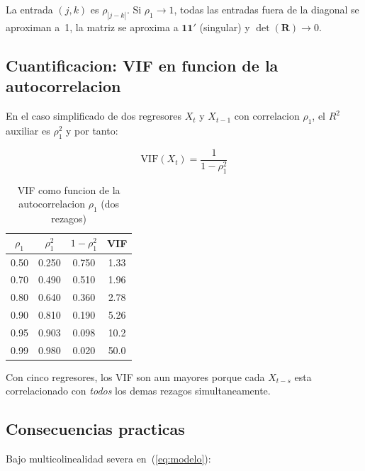 \documentclass[12pt, letterpaper]{article}
\theoremstyle{remark}
\begin{document}
\noindent La entrada $(j,k)$ es $\rho_{|j-k|}$. Si $\rho_1 \to 1$, todas las
entradas fuera de la diagonal se aproximan a~1, la matriz se aproxima a
$\mathbf{1}\mathbf{1}'$ (singular) y $\det(\mathbf{R}) \to 0$.

\subsection{Cuantificacion: VIF en funcion de la autocorrelacion}

En el caso simplificado de dos regresores $X_t$ y $X_{t-1}$ con correlacion
$\rho_1$, el $R^2$ auxiliar es $\rho_1^2$ y por tanto:

\begin{equation}
  \text{VIF}(X_t) = \frac{1}{1 - \rho_1^2}
  \label{eq:VIF_rho}
\end{equation}

\begin{table}[ht]
\centering
\caption{VIF como funcion de la autocorrelacion $\rho_1$ (dos rezagos)}
\label{tab:VIF}
\small
\begin{tabular}{cccc}
\toprule
$\rho_1$ & $\rho_1^2$ & $1 - \rho_1^2$ & VIF \\
\midrule
0.50 & 0.250 & 0.750 & 1.33 \\
0.70 & 0.490 & 0.510 & 1.96 \\
0.80 & 0.640 & 0.360 & 2.78 \\
0.90 & 0.810 & 0.190 & 5.26 \\
0.95 & 0.903 & 0.098 & 10.2 \\
0.99 & 0.980 & 0.020 & 50.0 \\
\bottomrule
\end{tabular}
\end{table}

\noindent Con cinco regresores, los VIF son aun mayores porque cada $X_{t-s}$
esta correlacionado con \emph{todos} los demas rezagos simultaneamente.

\subsection{Consecuencias practicas}

Bajo multicolinealidad severa en~(\ref{eq:modelo}):
\end{document}
